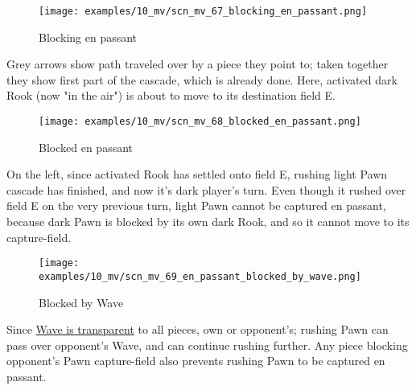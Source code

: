 
\noindent
\begin{wrapfigure}[7]{l}{0.4\textwidth}
\centering
\texttt{[image: examples/10\_mv/scn\_mv\_67\_blocking\_en\_passant.png]}
\vspace*{-1.4\baselineskip}
\caption{Blocking en passant}
\label{fig:scn_mv_67_blocking_en_passant}
\end{wrapfigure}
Grey arrows show path traveled over by a piece they point to; taken together they
show first part of the cascade, which is already done. \newline
\indent
Here, activated dark Rook (now "in the air") is about to move to its destination
field E.

\clearpage %

\vspace*{-2.1\baselineskip}
\noindent
\begin{wrapfigure}[10]{l}{0.4\textwidth}
\centering
\texttt{[image: examples/10\_mv/scn\_mv\_68\_blocked\_en\_passant.png]}
\vspace*{-1.4\baselineskip}
\caption{Blocked en passant}
\label{fig:scn_mv_68_blocked_en_passant}
\end{wrapfigure}
On the left, since activated Rook has settled onto field E, rushing light Pawn
cascade has finished, and now it's dark player's turn. \newline
\indent
Even though it rushed over field E on the very previous turn, light Pawn cannot
be captured en passant, because dark Pawn is blocked by its own dark Rook, and
so it cannot move to its capture-field.

\vspace*{3.7\baselineskip}
\noindent
\begin{wrapfigure}[13]{l}{0.4\textwidth}
\centering
\texttt{[image: examples/10\_mv/scn\_mv\_69\_en\_passant\_blocked\_by\_wave.png]}
\vspace*{-1.4\baselineskip}
\caption{Blocked by Wave}
\label{fig:scn_mv_69_en_passant_blocked_by_wave}
\end{wrapfigure}
Since \hyperref[fig:scn_mv_07_wave_is_transparent]{Wave is transparent} to all pieces,
own or opponent's; rushing Pawn can pass over opponent's Wave, and can continue rushing
further. Any piece blocking opponent's Pawn capture-field also prevents rushing Pawn to
be captured en passant.

